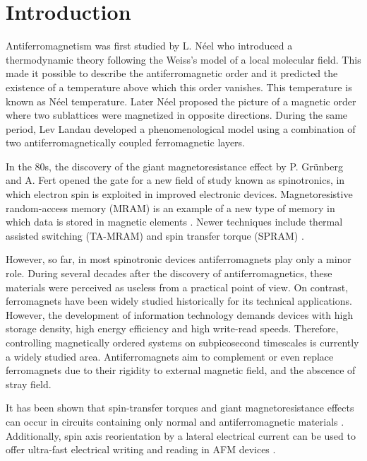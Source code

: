 \chapter{Introduction}
\label{ChapIntro}

Antiferromagnetism was first studied by L. N\'eel who introduced a thermodynamic theory following the Weiss's model of a local molecular field. This made it possible to describe the antiferromagnetic order and it predicted the existence of a temperature above which this order vanishes. This temperature is known as N\'eel temperature. Later N\'eel proposed the picture of a magnetic order where two sublattices were magnetized in opposite directions. During the same period, Lev Landau developed a phenomenological model using a combination of two antiferromagnetically coupled ferromagnetic layers.

In the 80s, the discovery of the giant magnetoresistance effect by P. Grünberg \cite{Binasch1989} and A. Fert \cite{Baibich1988} opened the gate for a new field of study known as spinotronics, in which electron spin is exploited in improved electronic devices. Magnetoresistive random-access memory (MRAM) is an example of a new type of memory in which data is stored in magnetic elements \citep{Akerman2005}. Newer techniques include thermal assisted switching (TA-MRAM) \citep{Bandiera2015} and spin transfer torque (SPRAM) \citep{Kawahara2012}.

However, so far, in most spinotronic devices antiferromagnets play only a minor role. During several decades after the discovery of antiferromagnetics, these materials were perceived as useless from a practical point of view. On contrast, ferromagnets have been widely studied historically for its technical applications. However, the development of information technology demands devices with high storage density, high energy efficiency and high write-read speeds. Therefore, controlling magnetically ordered systems on subpicosecond timescales is currently a widely studied area. Antiferromagnets aim to complement or even replace ferromagnets due to their rigidity to external magnetic field, and the abscence of stray field.

It has been shown that spin-transfer torques and giant magnetoresistance effects can occur in circuits containing only normal and antiferromagnetic materials \cite{MacDonald2011}. Additionally, spin axis reorientation by a lateral electrical current can be used to offer ultra-fast electrical writing and reading in AFM devices \cite{Zelezny2014}.

